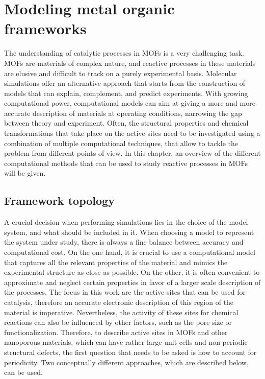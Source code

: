 \graphicspath{{figures/chapter2/}}
\renewcommand\evenpagerightmark{{\scshape\small Modeling metal organic frameworks}} 
\renewcommand\oddpageleftmark{{\scshape\small Chapter 2}}


\hyphenation{}

\chapter[Modeling metal organic frameworks]%
{Modeling metal organic frameworks}
\label{ch2}
The understanding of catalytic processes in MOFs is a very challenging task. MOFs are materials of complex nature, and reactive processes in these materials are elusive and difficult to track on a purely experimental basis. Molecular simulations offer an alternative approach that starts from the construction of models that can explain, complement, and predict experiments. With growing computational power, computational models can aim at giving a more and more accurate description of materials at operating conditions, narrowing the gap between theory and experiment. Often, the structural properties and chemical transformations that take place on the active sites need to be investigated using a combination of multiple computational techniques, that allow to tackle the problem from different points of view. 
In this chapter, an overview of the different computational methods that can be used to study reactive processes in MOFs will be given. 

\section{Framework topology}
A crucial decision when performing simulations lies in the choice of the model system, and what should be included in it. When choosing a model to represent the system under study, there is always a fine balance between accuracy and computational cost. 
On the one hand, it is crucial to use a computational model that captures all the relevant properties of the material and mimics the experimental structure as close as possible. On the other, it is often convenient to approximate and neglect certain properties in favor of a larger scale description of the processes. The focus in this work are the active sites that can be used for catalysis, therefore an accurate electronic description of this region of the material is imperative. Nevertheless, the activity of these sites for chemical reactions can also be influenced by other factors, such as the pore size or functionalization. Therefore, to describe active sites in MOFs and other nanoporous materials, which can have rather large unit cells and non-periodic structural defects, the first question that needs to be asked is how to account for periodicity. Two conceptually different approaches, which are described below, can be used.

